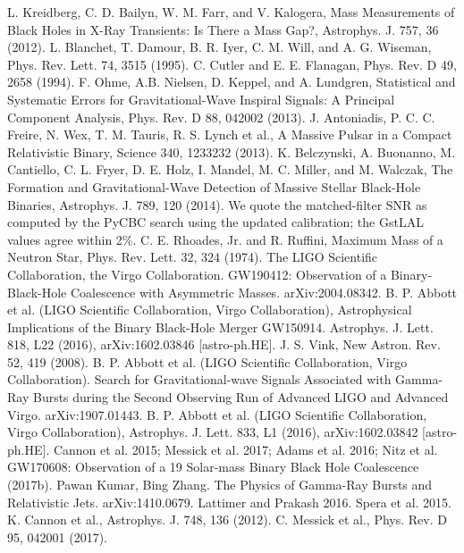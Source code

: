 \documentclass[binding=0.6cm, LaM]{sapthesis}
\begin{document}
\begin{thebibliography}{500}
	 L. Kreidberg, C. D. Bailyn, W. M. Farr, and V. Kalogera, Mass Measurements of Black Holes in X-Ray Transients: Is There a Mass Gap?, Astrophys. J. 757, 36 (2012). 
	 L. Blanchet, T. Damour, B. R. Iyer, C. M. Will, and A. G. Wiseman, Phys. Rev. Lett. 74, 3515 (1995).
	 C. Cutler and E. E. Flanagan, Phys. Rev. D 49, 2658 (1994). 
	 F. Ohme, A.B. Nielsen, D. Keppel, and A. Lundgren, Statistical and Systematic Errors for Gravitational-Wave Inspiral Signals: A Principal Component Analysis, Phys. Rev. D 88, 042002 (2013). 
	 J. Antoniadis, P. C. C. Freire, N. Wex, T. M. Tauris, R. S. Lynch et al., A Massive Pulsar in a Compact Relativistic Binary, Science 340, 1233232 (2013). 
	 K. Belczynski, A. Buonanno, M. Cantiello, C. L. Fryer, D. E. Holz, I. Mandel, M. C. Miller, and M. Walczak, The Formation and Gravitational-Wave Detection of Massive Stellar Black-Hole Binaries, Astrophys. J. 789, 120 (2014). 
	 We quote the matched-filter SNR as computed by the PyCBC search using the updated calibration; the GstLAL values agree within 2\%. 
	 C. E. Rhoades, Jr. and R. Ruffini, Maximum Mass of a Neutron Star, Phys. Rev. Lett. 32, 324 (1974).
         The LIGO Scientific Collaboration, the Virgo Collaboration. GW190412: Observation of a Binary-Black-Hole Coalescence with Asymmetric Masses. arXiv:2004.08342.
	 B. P. Abbott et al. (LIGO Scientific Collaboration, Virgo Collaboration), Astrophysical Implications of the Binary Black-Hole Merger GW150914. Astrophys. J. Lett. 818, L22 (2016), arXiv:1602.03846 [astro-ph.HE]. 
	 J. S. Vink, New Astron. Rev. 52, 419 (2008).
	 B. P. Abbott et al. (LIGO Scientific Collaboration, Virgo Collaboration). Search for Gravitational-wave Signals Associated with Gamma-Ray Bursts during the Second Observing Run of Advanced LIGO and Advanced Virgo. arXiv:1907.01443.
	 B. P. Abbott et al. (LIGO Scientific Collaboration, Virgo Collaboration), Astrophys. J. Lett. 833, L1 (2016), arXiv:1602.03842 [astro-ph.HE]. 
	 Cannon et al. 2015; Messick et al. 2017; Adams et al. 2016; Nitz et al. GW170608: Observation of a 19 Solar-mass Binary Black Hole Coalescence (2017b).
	 Pawan Kumar, Bing Zhang. The Physics of Gamma-Ray Bursts and Relativistic Jets. arXiv:1410.0679.
	 Lattimer and Prakash 2016.
	 Spera et al. 2015.
	 K. Cannon et al., Astrophys. J. 748, 136 (2012).
	 C. Messick et al., Phys. Rev. D 95, 042001 (2017).

\end{thebibliography}
\end{document}
